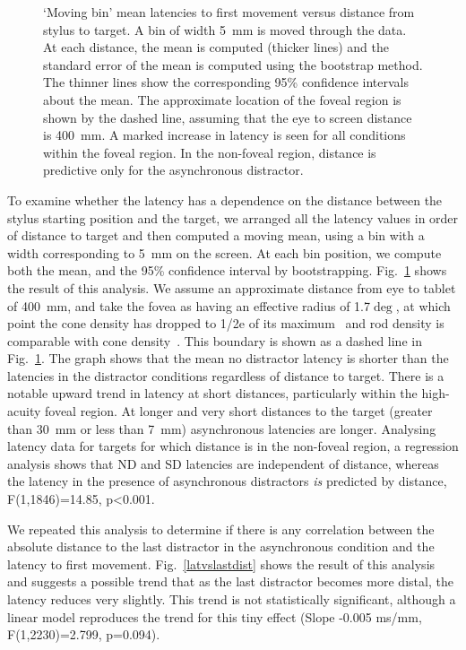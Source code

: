 \documentclass[10pt,letterpaper]{article}
\begin{document}
\begin{figure}[htb!]
\centering
\caption[Mean latencies vs. distance] {`Moving bin' mean latencies to
  first movement versus distance from stylus to target. A bin of width
  5~mm is moved through the data. At each distance, the mean is
  computed (thicker lines) and the standard error of the mean is
  computed using the bootstrap method. The thinner lines show the
  corresponding 95\% confidence intervals about the mean. The
  approximate location of the foveal region is shown by the dashed
  line, assuming that the eye to screen distance is 400~mm. A marked
  increase in latency is seen for all conditions within the foveal
  region. In the non-foveal region, distance is predictive only for
  the asynchronous distractor.}
\label{latvsdist}
\end{figure}

To examine whether the latency has a dependence on the distance
between the stylus starting position and the target, we arranged all
the latency values in order of distance to target and then computed a
moving mean, using a bin with a width corresponding to 5~mm on the
screen. At each bin position, we compute both the mean, and the 95\%
confidence interval by bootstrapping. Fig.~\ref{latvsdist} shows the
result of this analysis. We assume an approximate distance from eye to
tablet of 400~mm, and take the fovea as having an effective radius of
1.7$\deg$, at which point the cone density has dropped to 1/2e of its
maximum~\cite{hirsch_spatial_1989} and rod density is comparable with
cone density~\cite{jonas_count_1992}. This boundary is shown as a
dashed line in Fig.~\ref{latvsdist}. The graph shows that the mean no
distractor latency is shorter than the latencies in the distractor
conditions regardless of distance to target. There is a notable upward
trend in latency at short distances, particularly within the
high-acuity foveal region. At longer and very short distances to the
target (greater than 30~mm or less than 7~mm) asynchronous latencies
are longer. Analysing latency data for targets for which distance is
in the non-foveal region, a regression analysis shows that ND and SD
latencies are independent of distance, whereas the latency in the
presence of asynchronous distractors \emph{is} predicted by distance,
F(1,1846)=14.85, p\textless0.001.

We repeated this analysis to determine if there is any correlation
between the absolute distance to the last distractor in the
asynchronous condition and the latency to first
movement. Fig.~\ref{latvslastdist} shows the result of this analysis
and suggests a possible trend that as the last distractor becomes more
distal, the latency reduces very slightly. This trend is not
statistically significant, although a linear model reproduces the
trend for this tiny effect (Slope -0.005 ms/mm, F(1,2230)=2.799,
p=0.094).
\end{document}
